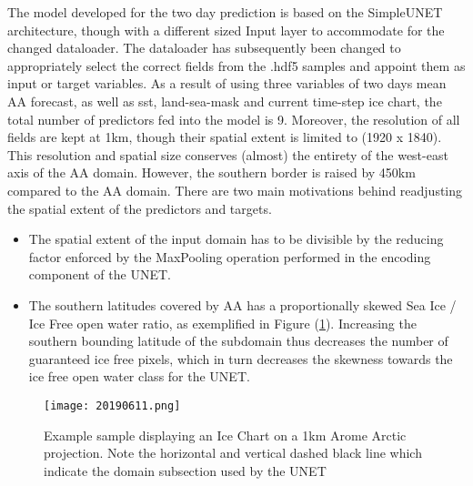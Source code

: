 \documentclass[../main/thesis]{subfiles}
\begin{document}



The model developed for the two day prediction is based on the SimpleUNET architecture, though with a different sized Input layer to accommodate for the changed dataloader. The dataloader has subsequently been changed to appropriately select the correct fields from the .hdf5 samples and appoint them as input or target variables. As a result of using three variables of two days mean AA forecast, as well as sst, land-sea-mask and current time-step ice chart, the total number of predictors fed into the model is 9. Moreover, the resolution of all fields are kept at 1km, though their spatial extent is limited to (1920 x 1840). This resolution and spatial size conserves (almost) the entirety of the west-east axis of the AA domain. However, the southern border is raised by 450km compared to the AA domain. There are two main motivations behind readjusting the spatial extent of the predictors and targets.

\begin{itemize}
    \item[1.] The spatial extent of the input domain has to be divisible by the reducing factor enforced by the MaxPooling operation performed in the encoding component of the UNET.
    \item[2.] The southern latitudes covered by AA has a proportionally skewed Sea Ice / Ice Free open water ratio, as exemplified in Figure (\ref{fig:exampleAAsouthborder}). Increasing the southern bounding latitude of the subdomain thus decreases the number of guaranteed ice free pixels, which in turn decreases the skewness towards the ice free open water class for the UNET.
\end{itemize}

\begin{figure}
    \texttt{[image: 20190611.png]}
    \caption{\label{fig:exampleAAsouthborder}Example sample displaying an Ice Chart on a 1km Arome Arctic projection. Note the horizontal and vertical dashed black line which indicate the domain subsection used by the UNET}
\end{figure}
\end{document}
